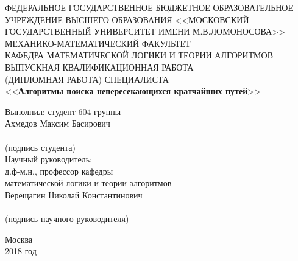\begin{center} 

ФЕДЕРАЛЬНОЕ ГОСУДАРСТВЕННОЕ БЮДЖЕТНОЕ ОБРАЗОВАТЕЛЬНОЕ УЧРЕЖДЕНИЕ ВЫСШЕГО ОБРАЗОВАНИЯ <<МОСКОВСКИЙ ГОСУДАРСТВЕННЫЙ УНИВЕРСИТЕТ ИМЕНИ М.В.ЛОМОНОСОВА>>\\[0.7cm]

МЕХАНИКО-МАТЕМАТИЧЕСКИЙ ФАКУЛЬТЕТ\\[0.7cm]

КАФЕДРА МАТЕМАТИЧЕСКОЙ ЛОГИКИ И ТЕОРИИ АЛГОРИТМОВ\\[3cm]

ВЫПУСКНАЯ КВАЛИФИКАЦИОННАЯ РАБОТА\\
(ДИПЛОМНАЯ РАБОТА) СПЕЦИАЛИСТА\\[0.7cm]

\large <<\textbf{Алгоритмы поиска непересекающихся кратчайших путей}>>\\[3.7cm]

\end{center} 

\begin{flushright}
Выполнил: студент 604 группы\\
Ахмедов Максим Басирович\\[0.5cm]

\underline{\hspace{6cm}}\\
(подпись студента)\\[1cm]

Научный руководитель:\\
д.ф-м.н., профессор кафедры \\
математической логики и теории алгоритмов\\
Верещагин Николай Константинович\\[0.5cm]

\underline{\hspace{6cm}}\\
(подпись научного руководителя)\

\end{flushright}


\vfill 

\begin{center} 
Москва\\
2018 год
\end{center} 

\thispagestyle{empty}
